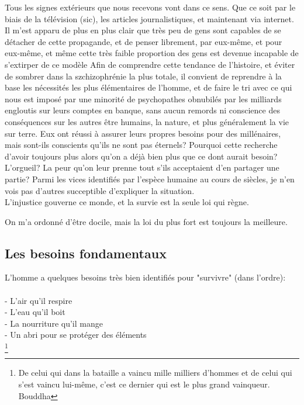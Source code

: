\documentclass[11pt]{article} %
\begin{document}
Tous les signes extérieurs que nous recevons vont dans ce sens. Que ce soit par le biais de la télévision (sic), les articles journalistiques, et maintenant via internet.
Il m'est apparu de plus en plus clair que très peu de gens sont capables de se détacher de cette propagande, et de penser librement, par eux-même, et pour eux-même, et même cette très faible proportion des gens est devenue incapable de s'extirper de ce modèle
Afin de comprendre cette tendance de l'histoire, et éviter de sombrer dans la szchizophrénie la plus totale, il convient de reprendre à la base les nécessités les plus élémentaires de l'homme, et de faire le tri avec ce qui nous est imposé par une minorité de psychopathes obnubilés par les milliards engloutis sur leurs comptes en banque, sans aucun remords ni conscience des conséquences sur les autres être humains, la nature, et plus généralement la vie sur terre.
Eux ont réussi à assurer leurs propres besoins pour des millénaires, mais sont-ils conscients qu'ils ne sont pas éternels? Pourquoi cette recherche d'avoir toujours plus alors qu'on a déjà bien plus que ce dont aurait besoin? L'orgueil? La peur qu'on leur prenne tout s'ils acceptaient d'en partager une partie?
Parmi les vices identifiés par l'espèce humaine au cours de siècles, je n'en vois pas d'autres succeptible d'expliquer la situation.\\

L'injustice gouverne ce monde, et la survie est la seule loi qui règne.

On m'a ordonné d'être docile, mais la loi du plus fort est toujours la meilleure.\\
\subsection{Les besoins fondamentaux}
L'homme a quelques besoins très bien identifiés pour "survivre" (dans l'ordre):\\\\
- L'air qu'il respire\\
- L'eau qu'il boit\\
- La nourriture qu'il mange\\
- Un abri pour se protéger des éléments\\

\footnote{De celui qui dans la bataille a vaincu mille milliers d'hommes et de celui qui s'est vaincu lui-même, c'est ce dernier qui est le plus grand vainqueur. Bouddha}
\end{document}
